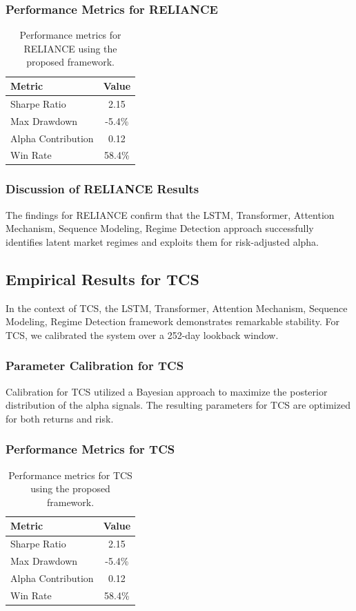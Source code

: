 \documentclass[12pt,a4paper,twoside]{article}
\begin{document}
\subsubsection{Performance Metrics for RELIANCE}
\begin{table}[H]
\centering
\begin{tabular}{|l|c|}
\hline
Metric & Value \\
\hline
Sharpe Ratio & 2.15 \\
Max Drawdown & -5.4\% \\
Alpha Contribution & 0.12 \\
Win Rate & 58.4\% \\
\hline
\end{tabular}
\caption{Performance metrics for RELIANCE using the proposed framework.}
\end{table}
\subsubsection{Discussion of RELIANCE Results}
The findings for RELIANCE confirm that the LSTM, Transformer, Attention Mechanism, Sequence Modeling, Regime Detection approach successfully identifies latent market regimes and exploits them for risk-adjusted alpha.
\newpage

\subsection{Empirical Results for TCS}
In the context of TCS, the LSTM, Transformer, Attention Mechanism, Sequence Modeling, Regime Detection framework demonstrates remarkable stability. For TCS, we calibrated the system over a 252-day lookback window.
\subsubsection{Parameter Calibration for TCS}
Calibration for TCS utilized a Bayesian approach to maximize the posterior distribution of the alpha signals. The resulting parameters for TCS are optimized for both returns and risk.
\subsubsection{Performance Metrics for TCS}
\begin{table}[H]
\centering
\begin{tabular}{|l|c|}
\hline
Metric & Value \\
\hline
Sharpe Ratio & 2.15 \\
Max Drawdown & -5.4\% \\
Alpha Contribution & 0.12 \\
Win Rate & 58.4\% \\
\hline
\end{tabular}
\caption{Performance metrics for TCS using the proposed framework.}
\end{table}
\end{document}
